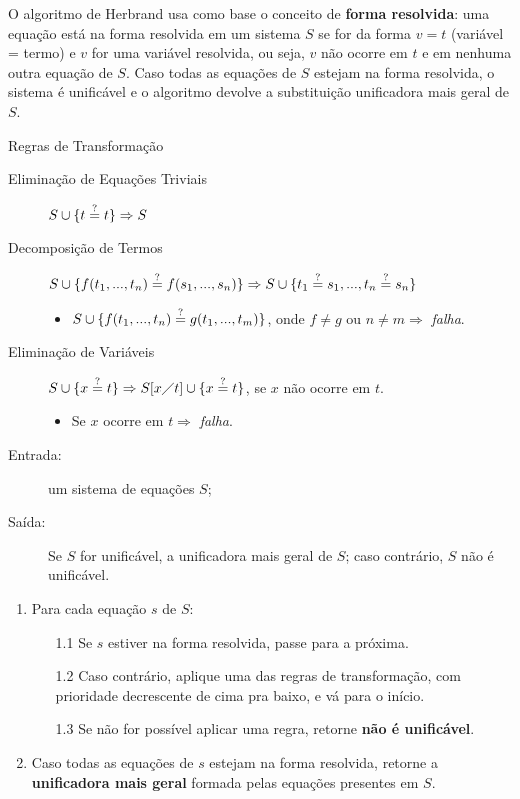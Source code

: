 O algoritmo de Herbrand usa como base o conceito de \textbf{forma resolvida}: uma equação está na forma resolvida em um sistema $S$ se for da forma $v = t$ (variável = termo) e $v$ for uma variável resolvida, ou seja, $v$ não ocorre em $t$ e em nenhuma outra equação de $S$. Caso todas as equações de $S$ estejam na forma resolvida, o sistema é unificável e o algoritmo devolve a substituição unificadora mais geral de $S$.

\begin{definition}{Regras de Transformação}
    \begin{description}
        \item[Eliminação de Equações Triviais] $S \cup \{t \overset{?}{=} t\} \Rightarrow S$
        \item[Decomposição de Termos] $S \cup \{f(t_1,...,t_n) \overset{?}{=} f(s_1,...,s_n)\} \Rightarrow S \cup \{t_1 \overset{?}{=} s_1,...,t_n \overset{?}{=} s_n\}$
        \begin{itemize}
            \item $S \cup \{f(t_1,...,t_n) \overset{?}{=} g(t_1,...,t_m)\}$, onde $f \neq g$ ou $n \neq m \Rightarrow$ \textit{falha}.
        \end{itemize}  
        \item[Eliminação de Variáveis] $S \cup \{x \overset{?}{=} t\} \Rightarrow S[x\diagup t] \cup \{x \overset{?}{=} t\}$, se $x$ não ocorre em $t$.
        \begin{itemize}
            \item Se $x$ ocorre em $t \Rightarrow$ \textit{falha}.
        \end{itemize}
    \end{description}
    \begin{description}
        \item[Entrada:] um sistema de equações $S$;
        \item[Saída:] Se $S$ for unificável, a unificadora mais geral de $S$; caso contrário, $S$ não é unificável.
    \end{description}
    \begin{enumerate}
        \item Para cada equação $s$ de $S$:
        \begin{enumerate}
            \item [1.1] Se $s$ estiver na forma resolvida, passe para a próxima.
            \item [1.2] Caso contrário, aplique uma das regras de transformação, com prioridade decrescente de cima pra baixo, e vá para o início.
            \item [1.3] Se não for possível aplicar uma regra, retorne \textbf{não é unificável}.
        \end{enumerate}
        \item Caso todas as equações de $s$ estejam na forma resolvida, retorne a \textbf{unificadora mais geral} formada pelas equações presentes em $S$.
    \end{enumerate}
\end{definition}

